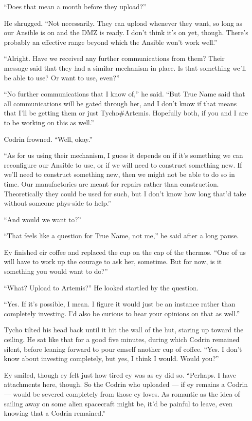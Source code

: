 ``Does that mean a month before they upload?''

He shrugged. ``Not necessarily. They can upload whenever they want, so long as our Ansible is on and the DMZ is ready. I don't think it's on yet, though. There's probably an effective range beyond which the Ansible won't work well.''

``Alright. Have we received any further communications from them? Their message said that they had a similar mechanism in place. Is that something we'll be able to use? Or want to use, even?''

``No further communications that I know of,'' he said. ``But True Name said that all communications will be gated through her, and I don't know if that means that I'll be getting them or just Tycho\#Artemis. Hopefully both, if you and I are to be working on this as well.''

Codrin frowned. ``Well, okay.''

``As for us using their mechanism, I guess it depends on if it's something we can reconfigure our Ansible to use, or if we will need to construct something new. If we'll need to construct something new, then we might not be able to do so in time. Our manufactories are meant for repairs rather than construction. Theoretically they could be used for such, but I don't know how long that'd take without someone phys-side to help.''

``And would we want to?''

``That feels like a question for True Name, not me,'' he said after a long pause.

Ey finished eir coffee and replaced the cup on the cap of the thermos. ``One of us will have to work up the courage to ask her, sometime. But for now, is it something you would want to do?''

``What? Upload to Artemis?'' He looked startled by the question.

``Yes. If it's possible, I mean. I figure it would just be an instance rather than completely investing. I'd also be curious to hear your opinions on that as well.''

Tycho tilted his head back until it hit the wall of the hut, staring up toward the ceiling. He sat like that for a good five minutes, during which Codrin remained silent, before leaning forward to pour emself another cup of coffee. ``Yes. I don't know about investing completely, but yes, I think I would. Would you?''

Ey smiled, though ey felt just how tired ey was as ey did so. ``Perhaps. I have attachments here, though. So the Codrin who uploaded — if ey remains a Codrin — would be severed completely from those ey loves. As romantic as the idea of sailing away on some alien spacecraft might be, it'd be painful to leave, even knowing that a Codrin remained.''

